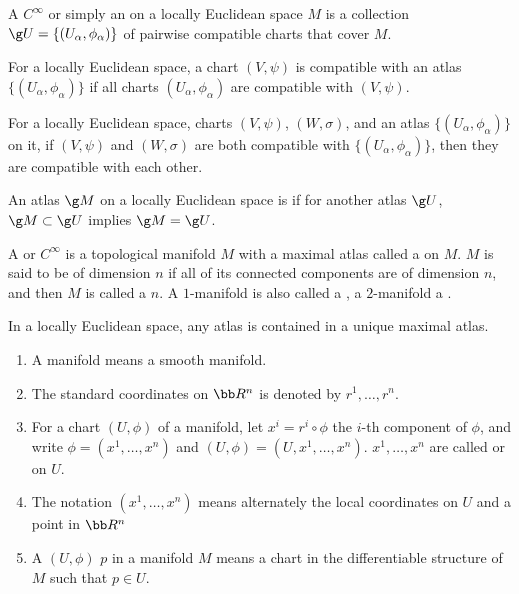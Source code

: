 A $C^\infty$  or simply an  on a locally Euclidean space $M$ is a collection $\g U = \{ (U_\alpha, \phi_\alpha) \}$ of pairwise compatible charts that cover $M$.

For a locally Euclidean space, a chart $(V, \psi)$ is compatible with an atlas $\{(U_\alpha, \phi_\alpha)\}$ if all charts $(U_\alpha, \phi_\alpha)$ are compatible with $(V, \psi)$.

For a locally Euclidean space, charts $(V, \psi)$, $(W, \sigma)$, and an atlas $\{( U_\alpha, \phi_\alpha)\}$ on it, if $(V, \psi)$ and $(W, \sigma)$ are both compatible with $\{(U_\alpha, \phi_\alpha)\}$, then they are compatible with each other.

An atlas $\g M$ on a locally Euclidean space is  if for another atlas $\g U$, $\g M \subset \g U$ implies $\g M = \g U$.

A  or $C^\infty$  is a topological manifold $M$ with a maximal atlas called a  on $M$. $M$ is said to be of dimension $n$ if all of its connected components are of dimension $n$, and then $M$ is called a $n$. A $1$-manifold is also called a , a $2$-manifold a .

In a locally Euclidean space, any atlas is contained in a unique maximal atlas.

\begin{enumerate}
  \item A manifold means a smooth manifold.
  \item The standard coordinates on $\bb R^n$ is denoted by $r^1, \dotsc, r^n$.
  \item For a chart $(U, \phi)$ of a manifold, let $x^i = r^i \circ \phi$ the $i$-th component of $\phi$, and write $\phi = (x^1, \dotsc, x^n)$ and $(U, \phi) = (U, x^1, \dotsc, x^n)$. $x^1, \dotsc, x^n$ are called  or  on $U$.
  \item The notation $(x^1, \dotsc, x^n)$ means alternately the local coordinates on $U$ and a point in $\bb R^n$
  \item A  $(U, \phi)$  $p$ in a manifold $M$ means a chart in the differentiable structure of $M$ such that $p \in U$.
\end{enumerate}

